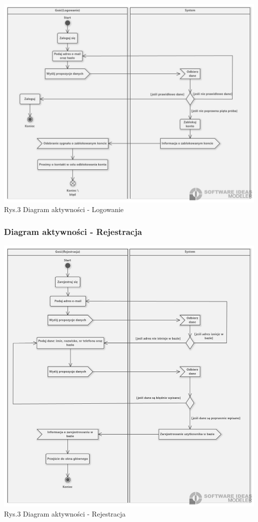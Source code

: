 \documentclass[12pt, letterpaper]{article}
\begin{document}
		\begin{center}
			\includegraphics[scale=0.5]{aclogowanie}\\
			\caption{Rys.3 Diagram aktywności - Logowanie}
		\end{center}	
		
		\subsubsection{Diagram aktywności - Rejestracja}
		
		\begin{center}
			\includegraphics[scale=0.5]{acrejestracja}\\
			\caption{Rys.3 Diagram aktywności - Rejestracja}
		\end{center}
		
\end{document}
